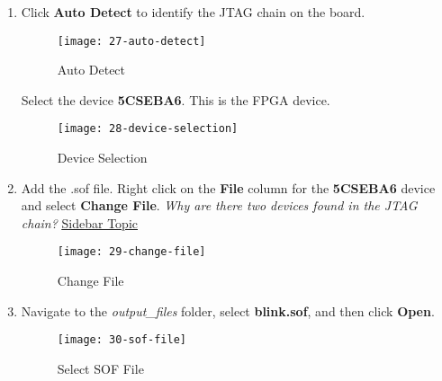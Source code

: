 \begin{flushleft}
\begin{enumerate}[
	label=\textbf{Step \arabic*.},
	leftmargin=*,
	widest={00},
	align=left]
\begin{enumerate}[
	label=\textbf{Step \arabic{enumi}\alph*.},
	leftmargin=*,
	align=left]
\item Click \textbf{Auto Detect} to identify the JTAG chain on the board.

\begin{figure}[H]
\centering
\texttt{[image: 27-auto-detect]}
\caption{Auto Detect}
\label{fig:27-auto-detect}
\end{figure}

\newpage

Select the device \textbf{5CSEBA6}. This is the FPGA device.

\begin{figure}[H]
\centering
\texttt{[image: 28-device-selection]}
\caption{Device Selection}
\label{fig:28-device-selection}
\end{figure}

\item Add the .sof file.
\newline
\newline
Right click on the \textbf{File} column for the \textbf{5CSEBA6} device and select \textbf{Change File}.
\newline
\newline
\emph{Why are there two devices found in the JTAG chain?} \hyperlink{side8}{\underline{Sidebar Topic}}

\begin{figure}[H]
\centering
\texttt{[image: 29-change-file]}
\caption{Change File}
\label{fig:29-change-file}
\end{figure}

\newpage

\item Navigate to the \emph{output\_files} folder, select \textbf{blink.sof}, and then click \textbf{Open}.

\begin{figure}[H]
\centering
\texttt{[image: 30-sof-file]}
\caption{Select SOF File}
\label{fig:30-sof-file}
\end{figure}


\end{enumerate}
\end{enumerate}
\end{flushleft}
